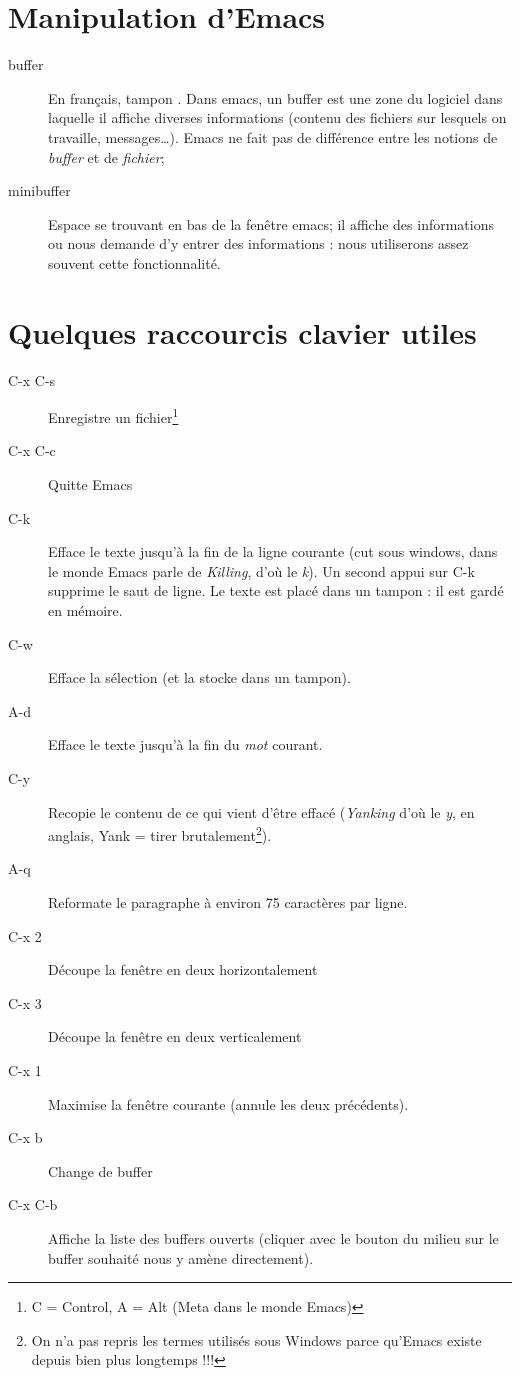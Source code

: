 \section{Manipulation d'Emacs}

\vfill

\begin{description}
\item[buffer] En français, \og tampon \fg. Dans emacs, un buffer est
  une zone du logiciel dans laquelle il affiche diverses informations
  (contenu des fichiers sur lesquels on travaille,
  messages\ldots). Emacs ne fait pas de différence entre les notions
  de \emph{buffer} et de \emph{fichier};
\item[minibuffer] Espace se trouvant en bas de la fenêtre emacs; il
  affiche des informations ou nous demande d'y entrer des informations
  : nous utiliserons assez souvent cette fonctionnalité.
\end{description}
\vfill

\section{Quelques raccourcis clavier utiles}

\begin{description}
\item[C-x C-s] Enregistre un fichier\footnote{C = Control, A = Alt
    (Meta dans le monde Emacs)}
\item[C-x C-c] Quitte Emacs
\item[C-k] Efface le texte jusqu'à la fin de la ligne courante (cut
  sous windows, dans le monde Emacs parle de \emph{Killing}, d'où le
  \emph{k}). Un second appui sur C-k supprime le saut de ligne. Le
  texte est placé dans un tampon : il est gardé en mémoire.
\item[C-w] Efface la sélection (et la stocke dans un tampon).
\item[A-d] Efface le texte jusqu'à la fin du \emph{mot} courant.
\item[C-y] Recopie le contenu de ce qui vient d'être effacé
  (\emph{Yanking} d'où le \emph{y}, en anglais, \og Yank \fg = tirer
  brutalement\footnote{On n'a pas repris les termes utilisés sous
    Windows parce qu'Emacs existe depuis bien plus longtemps !!!}).
\item[A-q] Reformate le paragraphe à environ 75 caractères par ligne.
\item[C-x 2] Découpe la fenêtre en deux horizontalement
\item[C-x 3] Découpe la fenêtre en deux verticalement
\item[C-x 1] Maximise la fenêtre courante (annule les deux
  précédents).
\item[C-x b] Change de buffer
\item[C-x C-b] Affiche la liste des buffers ouverts (cliquer avec le
  bouton du milieu sur le buffer souhaité nous y amène directement).
\end{description}



